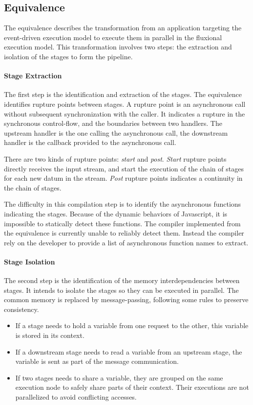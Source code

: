 \subsection{Equivalence}

The equivalence describes the transformation from an application targeting the event-driven execution model to execute them in parallel in the fluxional execution model.
This transformation involves two steps: the extraction and isolation of the stages to form the pipeline.

\paragraph{Stage Extraction} \label{chapter7:summary:extraction}

The first step is the identification and extraction of the stages.
The equivalence identifies rupture points between stages.
A rupture point is an asynchronous call without subsequent synchronization with the caller.
It indicates a rupture in the synchronous control-flow, and the boundaries between two handlers.
The upstream handler is the one calling the asynchronous call, the downstream handler is the callback provided to the asynchronous call.

There are two kinds of rupture points: \textit{start} and \textit{post}.
\textit{Start} rupture points directly receives the input stream, and start the execution of the chain of stages for each new datum in the stream.
\textit{Post} rupture points indicates a continuity in the chain of stages.

The difficulty in this compilation step is to identify the asynchronous functions indicating the stages.
Because of the dynamic behaviors of Javascript, it is impossible to statically detect these functions.
The compiler implemented from the equivalence is currently unable to reliably detect them.
Instead the compiler rely on the developer to provide a list of asynchronous function names to extract.

\paragraph{Stage Isolation} \label{chapter7:summary:isolation}

The second step is the identification of the memory interdependencies between stages.
It intends to isolate the stages so they can be executed in parallel.
The common memory is replaced by message-passing, following some rules to preserve consistency.
\begin{itemize}
\item If a stage needs to hold a variable from one request to the other, this variable is stored in its context.
\item If a downstream stage needs to read a variable from an upstream stage, the variable is sent as part of the message communication.
\item If two stages needs to share a variable, they are grouped on the same execution node to safely share parts of their context.
Their executions are not parallelized to avoid conflicting accesses.
\end{itemize}

